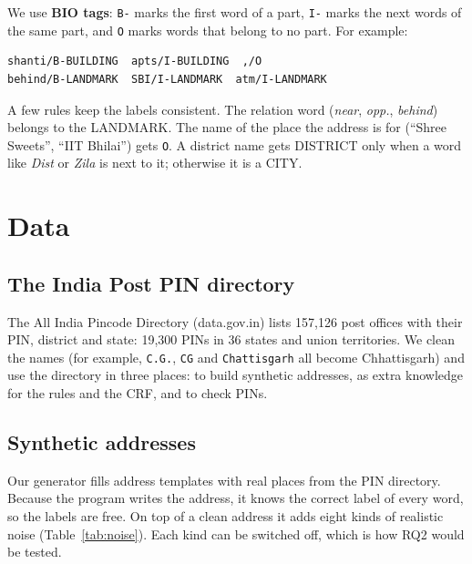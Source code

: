 \documentclass[11pt,a4paper]{article}
\newcommand{\code}[1]{\texttt{#1}}
\begin{document}
We use \textbf{BIO tags}: \code{B-} marks the first word of a part, \code{I-} marks the next words of the same part,
and \code{O} marks words that belong to no part. For example:
\begin{lstlisting}
shanti/B-BUILDING  apts/I-BUILDING  ,/O
behind/B-LANDMARK  SBI/I-LANDMARK  atm/I-LANDMARK
\end{lstlisting}
A few rules keep the labels consistent. The relation word (\emph{near}, \emph{opp.}, \emph{behind}) belongs to the
LANDMARK. The name of the place the address is for (``Shree Sweets'', ``IIT Bhilai'') gets \code{O}. A district name
gets DISTRICT only when a word like \emph{Dist} or \emph{Zila} is next to it; otherwise it is a CITY.

\section{Data}

\subsection{The India Post PIN directory}
The All India Pincode Directory (data.gov.in) lists 157,126 post offices with their PIN, district and state: 19,300
PINs in 36 states and union territories. We clean the names (for example, \code{C.G.}, \code{CG} and
\code{Chattisgarh} all become Chhattisgarh) and use the directory in three places: to build synthetic addresses, as
extra knowledge for the rules and the CRF, and to check PINs.

\subsection{Synthetic addresses}
Our generator fills address templates with real places from the PIN directory. Because the program writes the
address, it knows the correct label of every word, so the labels are free. On top of a clean address it adds eight
kinds of realistic noise (Table~\ref{tab:noise}). Each kind can be switched off, which is how RQ2 would be tested.
\end{document}
